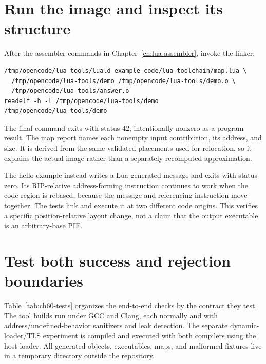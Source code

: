 \section{Run the image and inspect its structure}
\label{sec:ch60-run}

After the assembler commands in Chapter~\ref{ch:lua-assembler}, invoke the linker:
\begin{verbatim}
/tmp/opencode/lua-tools/luald example-code/lua-toolchain/map.lua \
  /tmp/opencode/lua-tools/demo /tmp/opencode/lua-tools/demo.o \
  /tmp/opencode/lua-tools/answer.o
readelf -h -l /tmp/opencode/lua-tools/demo
/tmp/opencode/lua-tools/demo
\end{verbatim}
The final command exits with status $42$, intentionally nonzero as a program result.
The map report names each nonempty input contribution, its address, and size.
It is derived from the same validated placements used for relocation, so it explains the actual image rather than a separately recomputed approximation.

The hello example instead writes a Lua-generated message and exits with status zero.
Its RIP-relative address-forming instruction continues to work when the code region is rebased, because the message and referencing instruction move together.
The tests link and execute it at two different code origins.
This verifies a specific position-relative layout change, not a claim that the output executable is an arbitrary-base PIE.

\section{Test both success and rejection boundaries}
\label{sec:ch60-tests}

Table~\ref{tab:ch60-tests} organizes the end-to-end checks by the contract they test.
The tool builds run under GCC and Clang, each normally and with address/undefined-behavior sanitizers and leak detection.
The separate dynamic-loader/TLS experiment is compiled and executed with both compilers using the host loader.
All generated objects, executables, maps, and malformed fixtures live in a temporary directory outside the repository.

